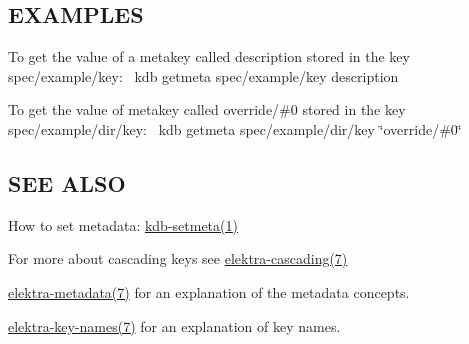 \subsection*{E\+X\+A\+M\+P\+L\+ES}

To get the value of a metakey called {\ttfamily description} stored in the key {\ttfamily spec/example/key}\+:~\newline
 {\ttfamily kdb getmeta spec/example/key description}

To get the value of metakey called {\ttfamily override/\#0} stored in the key {\ttfamily spec/example/dir/key}\+:~\newline
 {\ttfamily kdb getmeta spec/example/dir/key \char`\"{}override/\#0\char`\"{}}

\subsection*{S\+EE A\+L\+SO}


\begin{DoxyItemize}
\item How to set metadata\+: \hyperlink{doc_help_kdb-setmeta_md}{kdb-\/setmeta(1)}
\item For more about cascading keys see \hyperlink{doc_help_elektra-cascading_md}{elektra-\/cascading(7)}
\item \hyperlink{doc_help_elektra-metadata_md}{elektra-\/metadata(7)} for an explanation of the metadata concepts.
\item \hyperlink{doc_help_elektra-key-names_md}{elektra-\/key-\/names(7)} for an explanation of key names. 
\end{DoxyItemize}